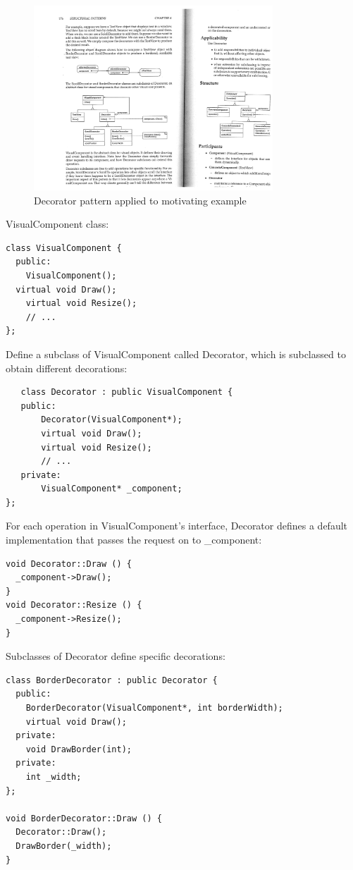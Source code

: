 \documentclass[11pt]{report}
\begin{document}
\begin{figure}
\includegraphics[width=0.8\textwidth]{deco-2.pdf}
\caption{Decorator pattern applied to motivating example }
\end{figure}

VisualComponent class:
\begin{lstlisting}
class VisualComponent {
  public:
    VisualComponent();
  virtual void Draw();
    virtual void Resize();
    // ...
};
\end{lstlisting}

Define a subclass of VisualComponent called Decorator, which is subclassed to obtain different decorations:
\begin{lstlisting}
   class Decorator : public VisualComponent {
   public:
       Decorator(VisualComponent*);
       virtual void Draw();
       virtual void Resize();
       // ...
   private:
       VisualComponent* _component;
};
\end{lstlisting}

For each operation in VisualComponent's interface, Decorator defines 
a default implementation that passes the request on to \_component:
\begin{lstlisting}
void Decorator::Draw () {
  _component->Draw();
}
void Decorator::Resize () {
  _component->Resize();
}
\end{lstlisting}

Subclasses of Decorator define specific decorations:
\begin{lstlisting}
class BorderDecorator : public Decorator {
  public:
    BorderDecorator(VisualComponent*, int borderWidth);
    virtual void Draw();
  private:
    void DrawBorder(int);
  private:
    int _width;
};

void BorderDecorator::Draw () {
  Decorator::Draw();
  DrawBorder(_width);
}
\end{lstlisting}
\end{document}
